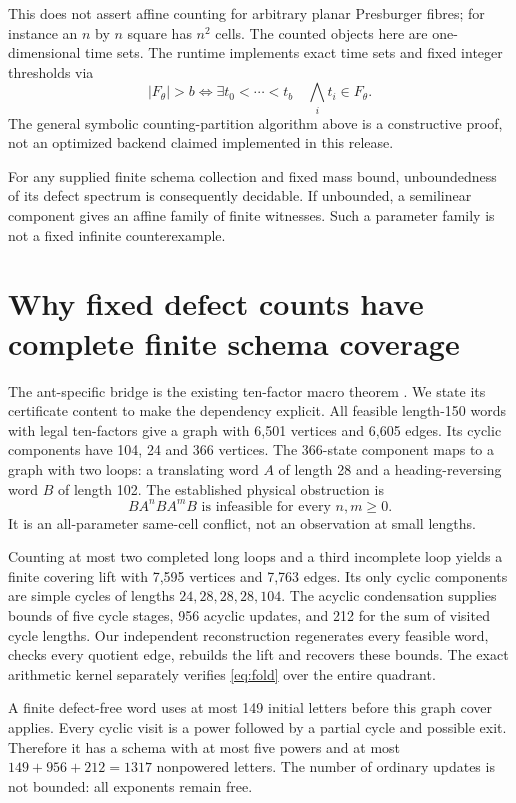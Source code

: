 \documentclass[11pt]{article}
\theoremstyle{remark}\newtheorem{remark}[theorem]{Remark}
\begin{document}
This does not assert affine counting for arbitrary planar Presburger fibres;
for instance an $n$ by $n$ square has $n^2$ cells. The counted objects here are
one-dimensional time sets. The runtime implements exact time sets and fixed
integer thresholds via
\[
 |F_\theta|>b\iff\exists t_0<\cdots<t_b\quad\bigwedge_i t_i\in F_\theta.
\]
The general symbolic counting-partition algorithm above is a constructive
proof, not an optimized backend claimed implemented in this release.

For any supplied finite schema collection and fixed mass bound, unboundedness
of its defect spectrum is consequently decidable. If unbounded, a semilinear
component gives an affine family of finite witnesses. Such a parameter family
is not a fixed infinite counterexample.

\section{Why fixed defect counts have complete finite schema coverage}
The ant-specific bridge is the existing ten-factor macro theorem
\cite{project}. We state its certificate content to make the dependency explicit.
All feasible length-150 words with legal ten-factors give a graph with 6,501
vertices and 6,605 edges. Its cyclic components have 104, 24 and 366 vertices.
The 366-state component maps to a graph with two loops: a translating word
$A$ of length 28 and a heading-reversing word $B$ of length 102. The established
physical obstruction is
\begin{equation}\label{eq:fold}
 BA^nBA^mB\text{ is infeasible for every }n,m\ge0.
\end{equation}
It is an all-parameter same-cell conflict, not an observation at small lengths.

Counting at most two completed long loops and a third incomplete loop yields
a finite covering lift with 7,595 vertices and 7,763 edges. Its only cyclic
components are simple cycles of lengths $24,28,28,28,104$. The acyclic
condensation supplies bounds of five cycle stages, 956 acyclic updates, and
212 for the sum of visited cycle lengths. Our independent reconstruction
regenerates every feasible word, checks every quotient edge, rebuilds the lift
and recovers these bounds. The exact arithmetic kernel separately verifies
\eqref{eq:fold} over the entire quadrant.

A finite defect-free word uses at most 149 initial letters before this graph
cover applies. Every cyclic visit is a power followed by a partial cycle and
possible exit. Therefore it has a schema with at most five powers and at most
$149+956+212=1317$ nonpowered letters. The number of ordinary updates is not
bounded: all exponents remain free.
\end{document}
